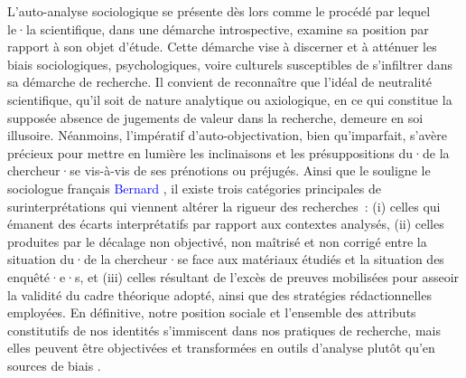 \begin{refsegment}
L'auto-analyse sociologique se présente dès lors comme le procédé par lequel le·la scientifique, dans une démarche introspective, examine sa position par rapport à son objet d'étude. Cette démarche vise à discerner et à atténuer les biais sociologiques, psychologiques, voire culturels susceptibles de s'infiltrer dans sa démarche de recherche. Il convient de reconnaître que l'idéal de neutralité scientifique, qu'il soit de nature analytique ou axiologique, en ce qui constitue la supposée absence de jugements de valeur dans la recherche, demeure en soi illusoire. Néanmoins, l'impératif d'auto-objectivation, bien qu'imparfait, s'avère précieux pour mettre en lumière les inclinaisons et les présuppositions du·de la chercheur·se vis-à-vis de ses prénotions ou préjugés. Ainsi que le souligne le sociologue français \textcolor{blue}{Bernard} \textcolor{blue}{\textcite[4]{lahire_risquer_1996}}, il existe trois catégories principales de surinterprétations qui viennent altérer la rigueur des recherches~: (i) celles qui émanent des écarts interprétatifs par rapport aux contextes analysés, (ii) celles produites par le décalage non objectivé, non maîtrisé et non corrigé entre la situation du·de la chercheur·se face aux matériaux étudiés et la situation des enquêté·e·s, et (iii) celles résultant de l'excès de preuves mobilisées pour asseoir la validité du cadre théorique adopté, ainsi que des stratégies rédactionnelles employées. En définitive, notre position sociale et l'ensemble des attributs constitutifs de nos identités s'immiscent dans nos pratiques de recherche, mais elles peuvent être objectivées et transformées en outils d'analyse plutôt qu'en sources de biais \textcolor{blue}{\autocite[7]{scarfo_ghellab_lauto-socio-analyse_2015}}.%


\end{refsegment}
